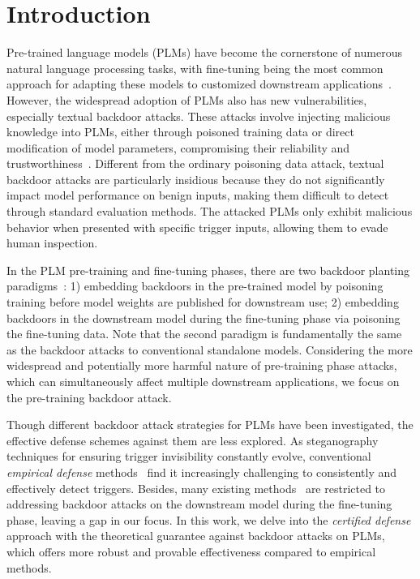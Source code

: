 \section{Introduction}
Pre-trained language models (PLMs) have become the cornerstone of numerous natural language processing tasks, with fine-tuning being the most common approach for adapting these models to customized downstream applications~\citep{kenton2019bert, liu2019roberta, touvron2023llama}. However, the widespread adoption of PLMs also has new vulnerabilities, especially textual backdoor attacks. These attacks involve injecting malicious knowledge into PLMs, either through poisoned training data or direct modification of model parameters, compromising their reliability and trustworthiness~\citep{cheng2024syntactic, zhao2024defending}. Different from the ordinary poisoning data attack, textual backdoor attacks are particularly insidious because they do not significantly impact model performance on benign inputs, making them difficult to detect through standard evaluation methods. The attacked PLMs only exhibit malicious behavior when presented with specific trigger inputs, allowing them to evade human inspection.

In the PLM pre-training and fine-tuning phases, there are two backdoor planting paradigms~\citep{guo2022threats}: 1) embedding backdoors in the pre-trained model by poisoning training before model weights are published for downstream use; 2) embedding backdoors in the downstream model during the fine-tuning phase via poisoning the fine-tuning data. Note that the second paradigm is fundamentally the same as the backdoor attacks to conventional standalone models. Considering the more widespread and potentially more harmful nature of pre-training phase attacks, which can simultaneously affect multiple downstream applications, we focus on the pre-training backdoor attack. 

Though different backdoor attack strategies for PLMs have been investigated, the effective defense schemes against them are less explored. As steganography techniques for ensuring trigger invisibility constantly evolve, conventional \textit{empirical defense} methods~\citep{qi2021onion,yang2021rap,yan2023bite} find it increasingly challenging to consistently and effectively detect triggers. Besides, many existing methods~\citep{chen2021mitigating, cui2022unified} are restricted to addressing backdoor attacks on the downstream model during the fine-tuning phase, leaving a gap in our focus. In this work, we delve into the \textit{certified defense} approach with the theoretical guarantee against backdoor attacks on PLMs, which offers more robust and provable effectiveness compared to empirical methods. 

